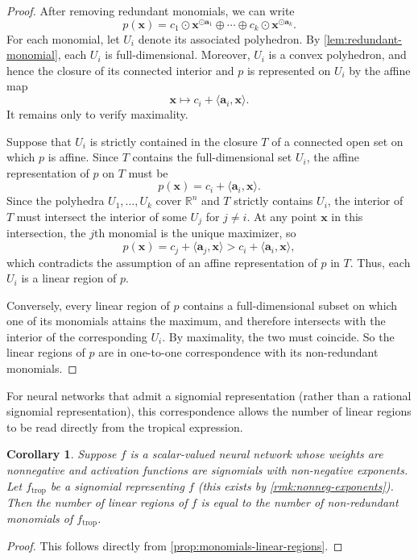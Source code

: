 \documentclass[10pt]{article}
\newtheorem{corollary}[theorem]{Corollary}
\theoremstyle{definition}
\theoremstyle{remark}
\newcommand{\RR}{{\mathbb{R}}}
\renewcommand{\vec}[1]{\mathbf{#1}}
\def\va{{\vec{a}}}
\def\vx{{\vec{x}}}
\begin{document}
\begin{proof}
After removing redundant monomials, we can write
$$
p(\vx) = c_1 \odot \vx^{\odot\va_1} \oplus \dotsb \oplus c_k \odot \vx^{\odot \va_k}.
$$
For each monomial, let $U_i$ denote its associated polyhedron. By \cref{lem:redundant-monomial}, each $U_i$ is full-dimensional. Moreover, $U_i$ is a convex polyhedron, and hence the closure of its connected interior and $p$ is represented on $U_i$ by the affine map
$$
\vx \mapsto c_i + \langle \va_i, \vx \rangle.
$$
It remains only to verify maximality.

Suppose that $U_i$ is strictly contained in the closure $T$ of a connected open set on which $p$ is affine. Since $T$ contains the full-dimensional set $U_i$, the affine representation of $p$ on $T$ must be
$$
p(\vx) = c_i + \langle \va_i, \vx \rangle.
$$
Since the polyhedra $U_1, \ldots, U_k$ cover $\RR^n$ and $T$ strictly contains $U_i$, the interior of $T$ must intersect the interior of some $U_j$ for $j \not= i$. At any point $\vx$ in this intersection, the $j$th monomial is the unique maximizer, so 
$$
p(\vx) = c_j + \langle \va_j, \vx \rangle > c_i + \langle \va_i, \vx \rangle,
$$
which contradicts the assumption of an affine representation of $p$ in $T$.  Thus, each $U_i$ is a linear region of $p$.

Conversely, every linear region of $p$ contains a full-dimensional subset on which one of its monomials attains the maximum, and therefore intersects with the interior of the corresponding $U_i$. By maximality, the two must coincide. So the linear regions of $p$ are in one-to-one correspondence with its non-redundant monomials.
\end{proof}

For neural networks that admit a signomial representation (rather than a rational signomial representation), this correspondence allows the number of linear regions to be read directly from the tropical expression.

\begin{corollary}
    Suppose $f$ is a scalar-valued neural network whose weights are nonnegative and activation functions are signomials with non-negative exponents. Let $f_\mathrm{trop}$ be a signomial representing $f$ (this exists by \cref{rmk:nonneg-exponents}).
    Then the number of linear regions of $f$ is equal to the number of non-redundant monomials of $f_\mathrm{trop}$.
\end{corollary}

\begin{proof}
    This follows directly from \cref{prop:monomials-linear-regions}.
\end{proof}
\end{document}
